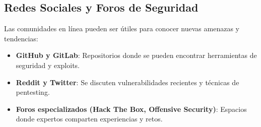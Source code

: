 \subsection{Redes Sociales y Foros de Seguridad}
Las comunidades en línea pueden ser útiles para conocer nuevas amenazas y tendencias:
\begin{itemize}
    \item \textbf{GitHub y GitLab}: Repositorios donde se pueden encontrar herramientas de seguridad y exploits.
    \item \textbf{Reddit y Twitter}: Se discuten vulnerabilidades recientes y técnicas de pentesting.
    \item \textbf{Foros especializados (Hack The Box, Offensive Security)}: Espacios donde expertos comparten experiencias y retos.
\end{itemize}   